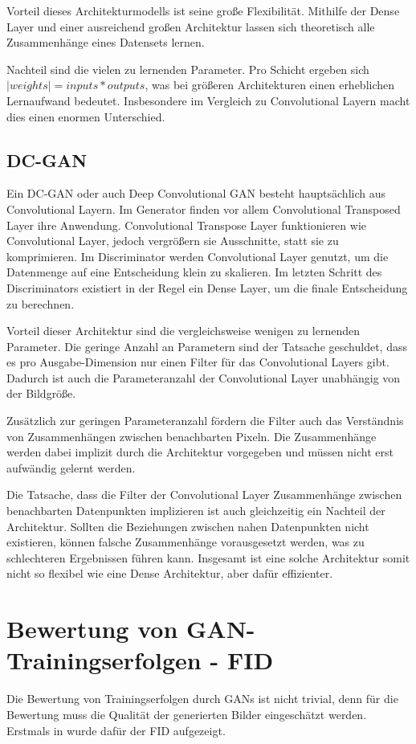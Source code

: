 Vorteil dieses Architekturmodells ist seine große Flexibilität.
Mithilfe der Dense Layer und einer ausreichend großen Architektur lassen sich theoretisch alle Zusammenhänge eines Datensets lernen.
\newline

Nachteil sind die vielen zu lernenden Parameter.
Pro Schicht ergeben sich $|weights| = inputs * outputs$, was bei größeren Architekturen einen erheblichen Lernaufwand bedeutet.
Insbesondere im Vergleich zu Convolutional Layern macht dies einen enormen Unterschied.

\subsection{DC-GAN}
Ein DC-GAN oder auch Deep Convolutional GAN besteht hauptsächlich aus Convolutional Layern.
Im Generator finden vor allem Convolutional Transposed Layer ihre Anwendung.
Convolutional Transpose Layer funktionieren wie Convolutional Layer, jedoch vergrößern sie Ausschnitte, statt sie zu komprimieren.
Im Discriminator werden Convolutional Layer genutzt, um die Datenmenge auf eine Entscheidung klein zu skalieren.
Im letzten Schritt des Discriminators existiert in der Regel ein Dense Layer, um die finale Entscheidung zu berechnen.
\newline

Vorteil dieser Architektur sind die vergleichsweise wenigen zu lernenden Parameter.
Die geringe Anzahl an Parametern sind der Tatsache geschuldet, dass es pro Ausgabe-Dimension nur einen Filter für das Convolutional Layers gibt.
Dadurch ist auch die Parameteranzahl der Convolutional Layer unabhängig von der Bildgröße.

Zusätzlich zur geringen Parameteranzahl fördern die Filter auch das Verständnis von Zusammenhängen zwischen benachbarten Pixeln.
Die Zusammenhänge werden dabei implizit durch die Architektur vorgegeben und müssen nicht erst aufwändig gelernt werden.
\newline

Die Tatsache, dass die Filter der Convolutional Layer Zusammenhänge zwischen benachbarten Datenpunkten implizieren ist auch gleichzeitig ein Nachteil der Architektur.
Sollten die Beziehungen zwischen nahen Datenpunkten nicht existieren, können falsche Zusammenhänge vorausgesetzt werden, was zu schlechteren Ergebnissen führen kann.
Insgesamt ist eine solche Architektur somit nicht so flexibel wie eine Dense Architektur, aber dafür effizienter.

\section{Bewertung von GAN-Trainingserfolgen - FID}
Die Bewertung von Trainingserfolgen durch GANs ist nicht trivial, denn für die Bewertung muss die Qualität der generierten Bilder eingeschätzt werden.
Erstmals in \cite{fid} wurde dafür der \acrfull{FID} aufgezeigt.

